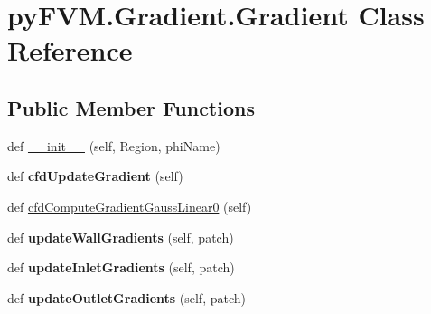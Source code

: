 \hypertarget{classpy_f_v_m_1_1_gradient_1_1_gradient}{}\section{py\+F\+V\+M.\+Gradient.\+Gradient Class Reference}
\label{classpy_f_v_m_1_1_gradient_1_1_gradient}
\subsection*{Public Member Functions}
\begin{DoxyCompactItemize}
\item 
def \mbox{\hyperlink{classpy_f_v_m_1_1_gradient_1_1_gradient_a3a3b4c96ac7a2ab3de27efbf25fd5870}{\+\_\+\+\_\+init\+\_\+\+\_\+}} (self, Region, phi\+Name)
\item 
\mbox{\label{classpy_f_v_m_1_1_gradient_1_1_gradient_a8fd8469f62dad3ec4a315a0214e34472}} 
def {\bfseries cfd\+Update\+Gradient} (self)
\item 
def \mbox{\hyperlink{classpy_f_v_m_1_1_gradient_1_1_gradient_abcf7ce6649997be35a814b72be1ef77c}{cfd\+Compute\+Gradient\+Gauss\+Linear0}} (self)
\item 
\mbox{\label{classpy_f_v_m_1_1_gradient_1_1_gradient_a79da8d58d5a9b787d0bc421dec372093}} 
def {\bfseries update\+Wall\+Gradients} (self, patch)
\item 
\mbox{\label{classpy_f_v_m_1_1_gradient_1_1_gradient_a7103975628f8e7b74db133370960d5d0}} 
def {\bfseries update\+Inlet\+Gradients} (self, patch)
\item 
\mbox{\label{classpy_f_v_m_1_1_gradient_1_1_gradient_a55e60ae975b6c90d1b3163834fd527b2}} 
def {\bfseries update\+Outlet\+Gradients} (self, patch)
\end{DoxyCompactItemize}
